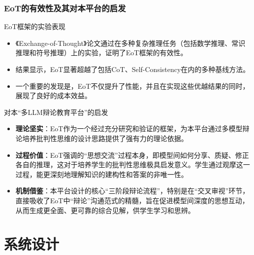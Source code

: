 \documentclass[aspectratio=169]{beamer} %
\begin{document}
\begin{frame}[allowframebreaks]
\frametitle{EoT的有效性及其对本平台的启发}
\begin{block}{EoT框架的实验表现}
    \begin{itemize}
        \item 《Exchange-of-Thought》论文通过在多种复杂推理任务（包括数学推理、常识推理和符号推理）上的实验，证明了EoT框架的有效性。
        \item 结果显示，EoT显著超越了包括CoT、Self-Consistency在内的多种基线方法。
        \item 一个重要的发现是，EoT不仅提升了性能，并且在实现这些优越结果的同时，展现了良好的成本效益。
    \end{itemize}
\end{block}

\begin{block}{对本“多LLM辩论教育平台”的启发}
    \begin{itemize}
        \item \textbf{理论坚实}：EoT作为一个经过充分研究和验证的框架，为本平台通过多模型辩论培养批判性思维的设计思路提供了强有力的理论依据。
        \item \textbf{过程价值}：EoT强调的“思想交流”过程本身，即模型间如何分享、质疑、修正各自的推理，这对于培养学生的批判性思维极具启发意义。学生通过观摩这一过程，能更深刻地理解知识的建构性和答案的非唯一性。
        \item \textbf{机制借鉴}：本平台设计的核心“三阶段辩论流程”，特别是在“交叉审视”环节，直接吸收了EoT中“辩论”沟通范式的精髓，旨在促进模型间深度的思想互动，从而生成更全面、更可靠的综合见解，供学生学习和思辨。
    \end{itemize}
\end{block}
\end{frame}

\section{系统设计}
\end{document}
